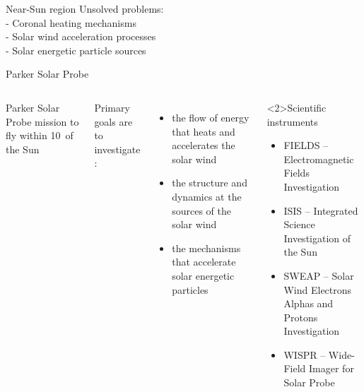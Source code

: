\begin{frame}[plain,c]{Near-Sun region}{}
	Unsolved problems:\\
	- Coronal heating mechanisms\\
	- Solar wind acceleration processes\\
	- Solar energetic particle sources
\end{frame}
\begin{frame}[plain,c]{Parker Solar Probe}{}
	\begin{columns}[c]
	\column{\textwidth}
		
		Parker Solar Probe mission to fly within 10\,\Rs{} of the Sun\\\ 
		
		Primary goals are to investigate \citep{Fox2015}:
		\begin{itemize}
			\item the flow of energy that heats and accelerates the solar wind
			\item the structure and dynamics at the sources of the solar wind
			\item the mechanisms that accelerate solar energetic particles
		\end{itemize}
		\vspace{5mm}
		\begin{block}<2>{Scientific instruments}
			\begin{itemize}
				\item FIELDS -- Electromagnetic Fields Investigation
				\item IS\sun{}IS -- Integrated Science Investigation of the Sun
				\item SWEAP -- Solar Wind Electrons Alphas and Protons Investigation
				\item WISPR -- Wide-Field Imager for Solar Probe
			\end{itemize}
		\end{block}

	\end{columns}
\end{frame}
